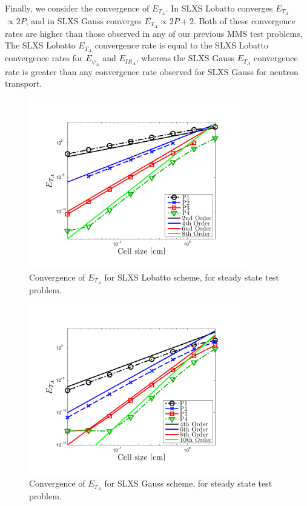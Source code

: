 Finally, we consider the convergence of $E_{T_A}$.  
In  SLXS Lobatto converges $E_{T_A}$ $\propto 2P$, and in 
SLXS Gauss converges $E_{T_A} \propto 2P+2$.  
Both of these convergence rates are higher than those observed in any of our previous MMS test problems.
The SLXS Lobatto $E_{T_A}$ convergence rate is equal to the SLXS Lobatto convergence rates for $E_{\psi_A}$ and $E_{IR_A}$, whereas the SLXS Gauss $E_{T_A}$ convergence rate is greater than any convergence rate observed for SLXS Gauss for neutron transport.
\begin{figure}[!htp]
\centering
\includegraphics[width=9.5cm,trim=0.25in  0.25in 0.75in 0.5in,clip=true]{chapter6_grey_radtran/Dissertation_Data/Constant_Time_SLXS_Lobatto_temp_A.pdf}
\caption{Convergence of $E_{T_A}$ for SLXS Lobatto scheme, for steady state test problem.}
\label{fig:constant_time_lobatto_t_a}
\end{figure}
%
%
\begin{figure}[!htp]
\centering
\includegraphics[width=9.5cm,trim=0.25in  0.25in 0.75in 0.5in,clip=true]{chapter6_grey_radtran/Dissertation_Data/Constant_Time_SLXS_Gauss_temp_A.pdf}
\caption{Convergence of $E_{T_A}$ for SLXS Gauss scheme, for steady state test problem.}
\label{fig:constant_time_gauss_t_a}
\end{figure}

